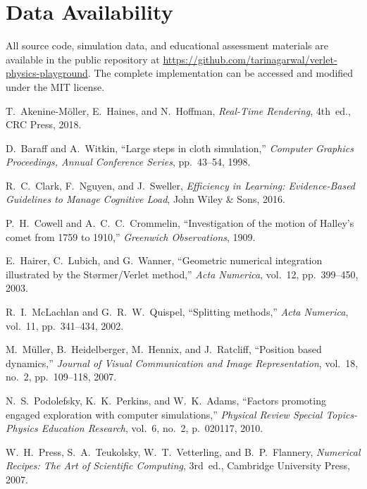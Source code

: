 \documentclass[12pt,journal,onecolumn]{IEEEtran}
\begin{document}
\section*{Data Availability}
All source code, simulation data, and educational assessment materials are available in the public repository at \url{https://github.com/tarinagarwal/verlet-physics-playground}. The complete implementation can be accessed and modified under the MIT license.

\begin{thebibliography}{99}

T.~Akenine-Möller, E.~Haines, and N.~Hoffman, \emph{Real-Time Rendering}, 4th~ed., CRC Press, 2018.

D.~Baraff and A.~Witkin, ``Large steps in cloth simulation,'' \emph{Computer Graphics Proceedings, Annual Conference Series}, pp.~43--54, 1998.

R.~C.~Clark, F.~Nguyen, and J.~Sweller, \emph{Efficiency in Learning: Evidence-Based Guidelines to Manage Cognitive Load}, John Wiley \& Sons, 2016.

P.~H.~Cowell and A.~C.~C.~Crommelin, ``Investigation of the motion of Halley's comet from 1759 to 1910,'' \emph{Greenwich Observations}, 1909.

E.~Hairer, C.~Lubich, and G.~Wanner, ``Geometric numerical integration illustrated by the Størmer/Verlet method,'' \emph{Acta Numerica}, vol.~12, pp.~399--450, 2003.

R.~I.~McLachlan and G.~R.~W.~Quispel, ``Splitting methods,'' \emph{Acta Numerica}, vol.~11, pp.~341--434, 2002.

M.~Müller, B.~Heidelberger, M.~Hennix, and J.~Ratcliff, ``Position based dynamics,'' \emph{Journal of Visual Communication and Image Representation}, vol.~18, no.~2, pp.~109--118, 2007.

N.~S.~Podolefsky, K.~K.~Perkins, and W.~K.~Adams, ``Factors promoting engaged exploration with computer simulations,'' \emph{Physical Review Special Topics-Physics Education Research}, vol.~6, no.~2, p.~020117, 2010.

W.~H.~Press, S.~A.~Teukolsky, W.~T.~Vetterling, and B.~P.~Flannery, \emph{Numerical Recipes: The Art of Scientific Computing}, 3rd~ed., Cambridge University Press, 2007.


\end{thebibliography}
\end{document}
